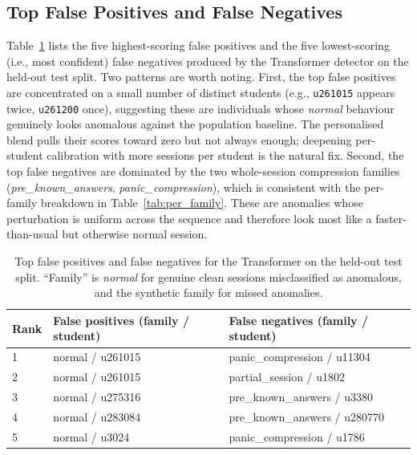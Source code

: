 \documentclass[sigconf]{acmart}
\begin{document}
\subsection{Top False Positives and False Negatives}
\label{sec:errors}
Table~\ref{tab:fp_fn} lists the five highest-scoring false positives and the five lowest-scoring (i.e., most confident) false negatives produced by the Transformer detector on the held-out test split. Two patterns are worth noting. First, the top false positives are concentrated on a small number of distinct students (e.g., \texttt{u261015} appears twice, \texttt{u261200} once), suggesting these are individuals whose \emph{normal} behaviour genuinely looks anomalous against the population baseline. The personalised blend pulls their scores toward zero but not always enough; deepening per-student calibration with more sessions per student is the natural fix. Second, the top false negatives are dominated by the two whole-session compression families (\emph{pre\_known\_answers}, \emph{panic\_compression}), which is consistent with the per-family breakdown in Table~\ref{tab:per_family}. These are anomalies whose perturbation is uniform across the sequence and therefore look most like a faster-than-usual but otherwise normal session.

\begin{table}[htbp]
\caption{Top false positives and false negatives for the Transformer on the held-out test split. ``Family'' is \emph{normal} for genuine clean sessions misclassified as anomalous, and the synthetic family for missed anomalies.}
\label{tab:fp_fn}
\centering
\small
\begin{tabular}{lll}
\toprule
\textbf{Rank} & \textbf{False positives (family / student)} & \textbf{False negatives (family / student)} \\
\midrule
1 & normal / u261015          & panic\_compression / u11304 \\
2 & normal / u261015          & partial\_session / u1802 \\
3 & normal / u275316          & pre\_known\_answers / u3380 \\
4 & normal / u283084          & pre\_known\_answers / u280770 \\
5 & normal / u3024            & panic\_compression / u1786 \\
\bottomrule
\end{tabular}
\end{table}
\end{document}
